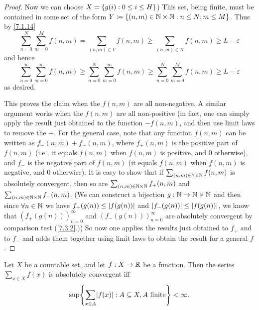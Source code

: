 \begin{proof}
	Now we can choose \(X = \left\lbrace g(i) : 0 \leq i \leq H\right\rbrace\))
	This set, being finite, must be contained in some set of the form \(Y \coloneqq \left\lbrace(n,m) \in \mathbb{N} \times \mathbb{N} : n \leq N; m \leq M \right\rbrace\).
	Thus by \cref{7.1.14}
	\[
		\sum_{n = 0}^N \sum_{m = 0}^M f(n, m) = \sum_{(n, m) \in Y} f(n, m) \geq \sum_{(n, m) \in X} f(n, m) \geq L - \varepsilon
	\]
	and hence
	\[
		\sum_{n = 0}^\infty \sum_{m = 0}^\infty f(n, m) \geq \sum_{n = 0}^N \sum_{m = 0}^\infty f(n, m) \geq \sum_{n = 0}^N \sum_{m = 0}^M f(n, m) \geq L - \varepsilon
	\]
	as desired.

	This proves the claim when the \(f(n, m)\) are all non-negative.
	A similar argument works when the \(f(n, m)\) are all non-positive
	(in fact, one can simply apply the result just obtained to the function \(-f(n, m)\), and then use limit laws to remove the \(-\).
	For the general case, note that any function \(f(n, m)\) can be written as \(f_+(n, m) + f_-(n, m)\), where \(f_+(n, m)\) is the positive part of \(f(n, m)\)
	(i.e., it equals \(f(n, m)\) when \(f(n, m)\) is positive, and \(0\) otherwise),
	and \(f_-\) is the negative part of \(f(n, m)\)
	(it equals \(f(n, m)\) when \(f(n, m)\) is negative, and \(0\) otherwise).
	It is easy to show that if \(\sum_{(n, m) \in \mathbb{N} \times \mathbb{N}} f(n, m)\) is absolutely convergent, then so are \(\sum_{(n, m) \in \mathbb{N} \times \mathbb{N}} f_+(n, m)\) and \(\sum_{(n, m) \in \mathbb{N} \times \mathbb{N}} f_-(n, m)\).
	(We can construct a bijection \(g : \mathbb{N} \to \mathbb{N} \times \mathbb{N}\) and then since \(\forall n \in \mathbb{N}\) we have \(f_+(g(n)) \leq \left\lvert f(g(n))\right\rvert\) and \(\left\lvert f_-(g(n))\right\rvert \leq \left\lvert f(g(n))\right\rvert\), we know that \((f_+(g(n)))_{n = 0}^\infty\) and \((f_-(g(n)))_{n = 0}^\infty\) are absolutely convergent by comparison test (\cref{7.3.2}.))
	So now one applies the results just obtained to \(f_+\) and to \(f_-\) and adds them together using limit laws to obtain the result for a general \(f\).
\end{proof}

\begin{lem}\label{8.2.3}
	Let \(X\) be a countable set, and let \(f : X \to \mathbb{R}\) be a function.
	Then the series \(\sum_{x \in X} f(x)\) is absolutely convergent iff
	\[
		\sup\set{\sum_{x \in A} \abs{f(x)} : A \subseteq X, A \text{ finite}} < \infty.
	\]
\end{lem}

